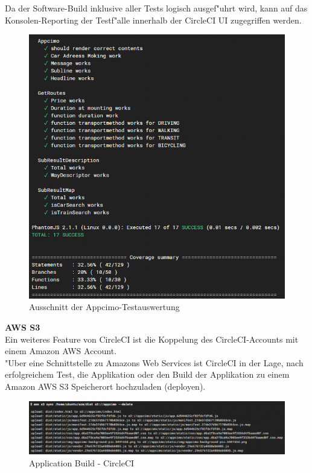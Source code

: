 \documentclass[a4paper, 11pt]{scrreprt}
\begin{document}
Da der Software-Build inklusive aller Tests logisch ausgef"uhrt wird, kann auf das Konsolen-Reporting der Testf"alle innerhalb der CircleCI UI zugegriffen werden. \\


\begin{figure} [H]
\begin{center}
\includegraphics[scale=0.7]{build2.png}
\caption{Ausschnitt der Appcimo-Testauswertung}
\label{circlecitest}
\end{center}
\end{figure}


\textbf{AWS S3} \\
Ein weiteres Feature von CircleCI ist die Koppelung des CircleCI-Accounts mit einem Amazon AWS Account. \\
"Uber eine Schnittstelle zu Amazons Web Services ist CircleCI in der Lage, nach erfolgreichem Test, die Applikation oder den Build der Applikation zu einem Amazon AWS S3 Speicherort hochzuladen (deployen).\\

\begin{figure} [H]
\begin{center}
\includegraphics[scale=0.7]{build3.png}
\caption{Application Build - CircleCI}
\label{circlecitest}
\end{center}
\end{figure}
\end{document}
